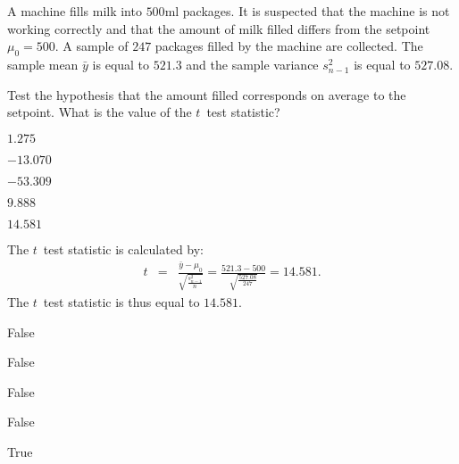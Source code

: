 
\begin{question}
A machine fills milk into $500$ml packages. It is suspected that the 
machine is not working correctly and that the amount of milk filled differs 
from the setpoint $\mu_0 = 500$. A sample of $247$ packages 
filled by the machine are collected. The sample mean $\bar{y}$ is equal to 
$521.3$ and the sample variance $s^2_{n-1}$ is equal to 
$527.08$.

Test the hypothesis that the amount filled corresponds on average to the 
setpoint. What is the value of the $t$~test statistic?

\begin{answerlist}
  \item $  1.275$
  \item $-13.070$
  \item $-53.309$
  \item $  9.888$
  \item $ 14.581$
\end{answerlist}
\end{question}

\begin{solution}
The $t$~test statistic is calculated by:
\begin{eqnarray*}
  t & = & \frac{\bar y - \mu_0}{\sqrt{\frac{s^2_{n-1}}{n}}}
  = \frac{521.3 - 500}{\sqrt{\frac{527.08}{247}}}
  = 14.581.
\end{eqnarray*}
The $t$~test statistic is thus equal to
$14.581$.

\begin{answerlist}
  \item False
  \item False
  \item False
  \item False
  \item True
\end{answerlist}
\end{solution}

